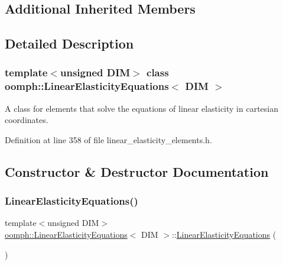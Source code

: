 \subsection*{Additional Inherited Members}


\subsection{Detailed Description}
\subsubsection*{template$<$unsigned D\+IM$>$\newline
class oomph\+::\+Linear\+Elasticity\+Equations$<$ D\+I\+M $>$}

A class for elements that solve the equations of linear elasticity in cartesian coordinates. 

Definition at line 358 of file linear\+\_\+elasticity\+\_\+elements.\+h.



\subsection{Constructor \& Destructor Documentation}
\mbox{\label{classoomph_1_1LinearElasticityEquations_adba9f0b6b22592ff24cdefc02bb57c7f}} 
\subsubsection{\texorpdfstring{Linear\+Elasticity\+Equations()}{LinearElasticityEquations()}}
{\footnotesize\ttfamily template$<$unsigned D\+IM$>$ \\
\hyperlink{classoomph_1_1LinearElasticityEquations}{oomph\+::\+Linear\+Elasticity\+Equations}$<$ D\+IM $>$\+::\hyperlink{classoomph_1_1LinearElasticityEquations}{Linear\+Elasticity\+Equations} (\begin{DoxyParamCaption}{ }\end{DoxyParamCaption})\hspace{0.3cm}{\ttfamily [inline]}}



